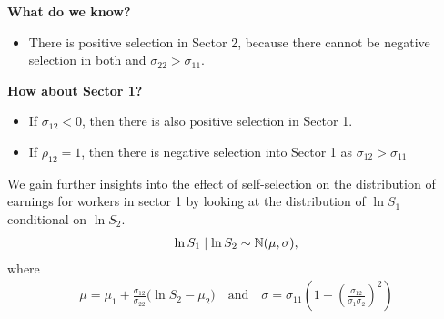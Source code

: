 \begin{frame}
	\textbf{What do we know?}
	\begin{itemize}\setlength\itemsep{1em}
		\item There is positive selection in Sector 2, because there cannot be negative selection in both and $\sigma_{22} > \sigma_{11}$.
	\end{itemize}\medskip
	\textbf{How about Sector 1?}
	\begin{itemize}\setlength\itemsep{1em}
		\item If $\sigma_{12} < 0$, then there is also positive selection in Sector 1.
		\item If $\rho_{12} = 1$, then there is negative selection into Sector 1 as $\sigma_{12} > \sigma_{11}$
	\end{itemize}
\end{frame}
\begin{frame}
	We gain further insights into the effect of self-selection on the distribution of earnings for workers in sector 1 by looking at the  distribution of $\ln S_1$  conditional on $\ln S_2$.
	\begin{align*}
	\ln S_1 \mid \ln S_2 \sim \mathbb{N} (\mu, \sigma),
	\end{align*}
	where
	\begin{align*}
	\mu = \mu_1 + \frac{\sigma_{12}}{\sigma_{22}} \Bigg(\ln S_2 - \mu_2\Bigg) \quad\text{and}\quad
	\sigma = \sigma_{11} \left(1 - \left(\frac{\sigma_{12}}{\sigma_1 \sigma_2}\right)^2\right)
	\end{align*}
\end{frame}

